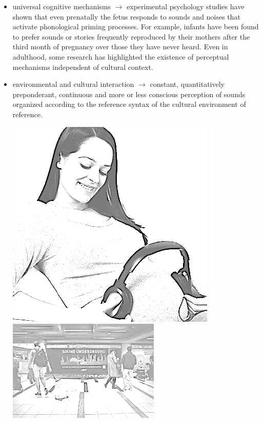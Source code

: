 \begin{itemize}
\item universal cognitive mechanisms \(\rightarrow\) experimental psychology studies have shown that even prenatally the fetus responds to sounds and noises that activate phonological priming processes. For example, infants have been found to prefer sounds or stories frequently reproduced by their mothers after the third month of pregnancy over
those they have never heard. Even in adulthood, some research has highlighted the existence of perceptual mechanisms independent of cultural context.

\item environmental and cultural interaction \(\rightarrow\) constant, quantitatively preponderant, continuous and more or less conscious perception of sounds organized according to the reference syntax of the cultural environment of reference.
  
\begin{center}
\includegraphics[scale=0.3]{../img/prenatale.png}
\includegraphics[scale=0.61]{../img/metro.png}
\end{center}
\end{itemize}

